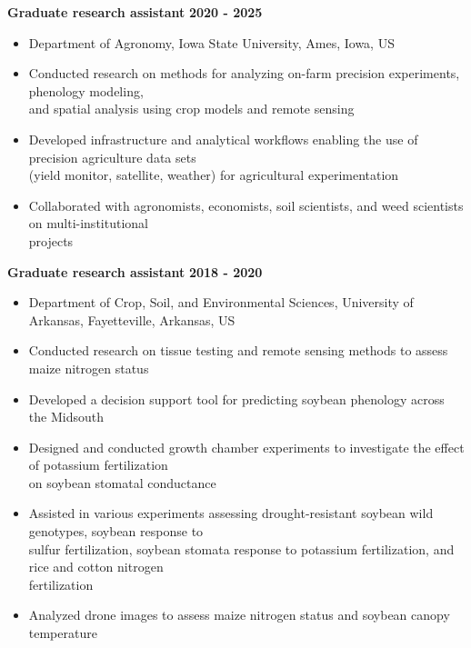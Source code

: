 \documentclass[letterpaper,10pt]{article}
\begin{document}
{\bf Graduate research assistant} \hfill {\bf 2020
- 2025}
\vspace{-.1in}
\begin{itemize}
\itemsep-0.5em
\renewcommand\labelitemi{{\boldmath$\cdot$}}
\item 
Department of Agronomy, Iowa State University, Ames, Iowa, US

\item Conducted research on methods for analyzing
	on-farm precision experiments, phenology
	modeling,\\ and spatial analysis using crop
	models and remote sensing
	
\item Developed infrastructure and analytical
	workflows enabling the use of precision
	agriculture
	data sets\\(yield monitor, satellite,
	weather) for agricultural experimentation

\item Collaborated with agronomists, economists, soil
	scientists, and weed scientists on
	multi-institutional\\ projects


\end{itemize}

{\bf Graduate research assistant }\hfill {\bf 2018 - 2020}
\vspace{-.1in}
\begin{itemize}
\renewcommand\labelitemi{{\boldmath$\cdot$}}
\itemsep-0.5em
\item 
Department of Crop, Soil, and Environmental
Sciences,
University of Arkansas, 
Fayetteville, Arkansas, US

\item Conducted research on tissue testing and
	remote sensing methods to assess maize
	nitrogen status
\item Developed a decision support tool for
	predicting soybean phenology across the
	Midsouth
\item Designed and conducted growth chamber
	experiments to investigate the effect of
	potassium fertilization\\on soybean
	stomatal conductance 
\item Assisted in various experiments assessing
	drought-resistant soybean wild genotypes,
	soybean response to\\sulfur fertilization, 
	soybean stomata response to potassium
	fertilization, and rice and cotton
	nitrogen\\fertilization
\item Analyzed drone images to assess maize
	nitrogen status and soybean canopy
	temperature
\end{itemize}
\end{document}
